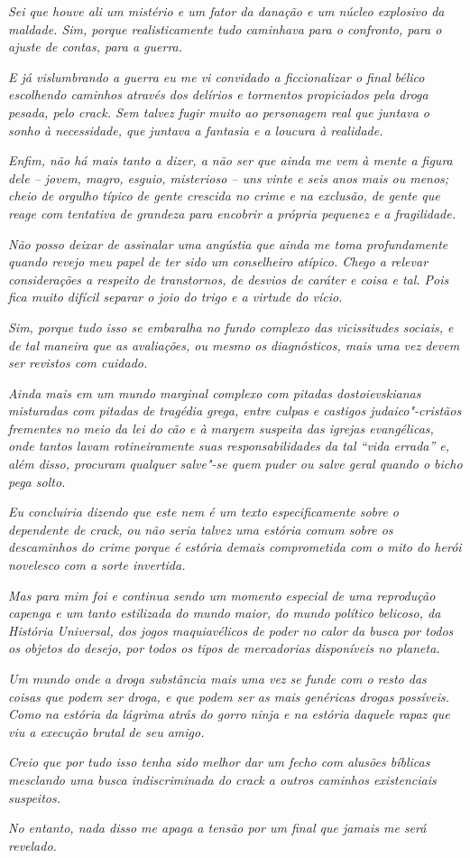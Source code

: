 \emph{Sei que houve ali um mistério e um fator da danação e um núcleo
explosivo da maldade. Sim, porque realisticamente tudo caminhava para o
confronto, para o ajuste de contas, para a guerra.}~

\emph{E já vislumbrando a guerra eu me vi convidado a ficcionalizar o
final bélico escolhendo caminhos através dos delírios e tormentos
propiciados pela droga pesada, pelo crack. Sem talvez fugir muito ao
personagem real que juntava o sonho à necessidade, que juntava a
fantasia e a loucura à realidade.}~

\emph{Enfim, não há mais tanto a dizer, a não ser que ainda me vem à
mente a figura dele -- jovem, magro, esguio, misterioso -- uns vinte e
seis anos mais ou menos; cheio de orgulho típico de gente crescida no
crime e na exclusão, de gente que reage com tentativa de grandeza para
encobrir a própria pequenez e a fragilidade.}~

\emph{Não posso deixar de assinalar uma angústia que ainda me toma
profundamente quando revejo meu papel de ter sido um conselheiro
atípico. Chego a relevar considerações a respeito de transtornos, de
desvios de caráter e coisa e tal. Pois fica muito difícil separar o joio
do trigo e a virtude do vício.}~

\emph{Sim, porque tudo isso se embaralha no fundo complexo das
vicissitudes sociais, e de tal maneira que as avaliações, ou mesmo os
diagnósticos, mais uma vez devem ser revistos com cuidado.}~

\emph{Ainda mais em um mundo marginal complexo com pitadas
dostoievskianas misturadas com pitadas de tragédia grega, entre culpas e
castigos judaico"-cristãos frementes no meio da lei do cão e à margem
suspeita das igrejas evangélicas, onde tantos lavam rotineiramente suas
responsabilidades da tal ``vida errada'' e, além disso, procuram
qualquer salve"-se quem puder ou salve geral quando o bicho pega solto.}~

\emph{Eu concluiria dizendo que este nem é um texto especificamente
sobre o dependente de crack, ou não seria talvez uma estória comum sobre
os descaminhos do crime porque é estória demais comprometida com o mito
do herói novelesco com a sorte invertida.}~

\emph{Mas para mim foi e continua sendo um momento especial de uma
reprodução capenga e um tanto estilizada do mundo maior, do mundo
político belicoso, da História Universal, dos jogos maquiavélicos de
poder no calor da busca por todos os objetos do desejo, por todos os
tipos de mercadorias disponíveis no planeta.}~

\emph{Um mundo onde a droga substância mais uma vez se funde com o resto
das coisas que podem ser droga, e que podem ser as mais genéricas drogas
possíveis. Como na estória da lágrima atrás do gorro ninja e na estória
daquele rapaz que viu a execução brutal de seu amigo.}~

\emph{Creio que por tudo isso tenha sido melhor dar um fecho com alusões
bíblicas mesclando uma busca indiscriminada do crack a outros caminhos
existenciais suspeitos.}~

\emph{No entanto, nada disso me apaga a tensão por um final que jamais
me será revelado.~}

